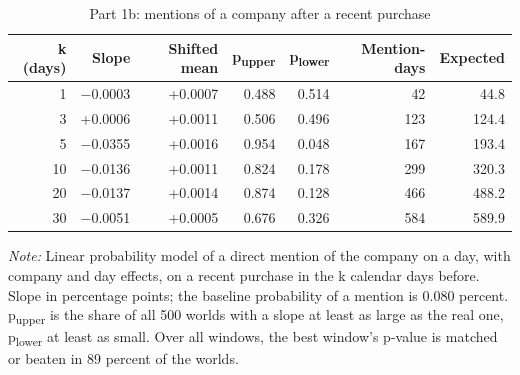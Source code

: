 \begin{table}[htbp]
\centering
\small
\setlength{\tabcolsep}{4pt}
\caption{Part 1b: mentions of a company after a recent purchase}
\label{tab:part1b}
\begin{tabular}{rrrrrrr}
\toprule
k (days) & Slope & Shifted mean & p\textsubscript{upper} & p\textsubscript{lower} & Mention-days & Expected \\
\midrule
1 & $-$0.0003 & +0.0007 & 0.488 & 0.514 & 42 & 44.8 \\
3 & +0.0006 & +0.0011 & 0.506 & 0.496 & 123 & 124.4 \\
5 & $-$0.0355 & +0.0016 & 0.954 & 0.048 & 167 & 193.4 \\
10 & $-$0.0136 & +0.0011 & 0.824 & 0.178 & 299 & 320.3 \\
20 & $-$0.0137 & +0.0014 & 0.874 & 0.128 & 466 & 488.2 \\
30 & $-$0.0051 & +0.0005 & 0.676 & 0.326 & 584 & 589.9 \\
\bottomrule
\end{tabular}
\par\medskip
\begin{minipage}{\linewidth}\footnotesize\textit{Note:} Linear probability model of a direct mention of the company on a day, with company and day effects, on a recent purchase in the k calendar days before. Slope in percentage points; the baseline probability of a mention is 0.080 percent. p\textsubscript{upper} is the share of all 500 worlds with a slope at least as large as the real one, p\textsubscript{lower} at least as small. Over all windows, the best window's p-value is matched or beaten in 89 percent of the worlds.\end{minipage}
\end{table}
